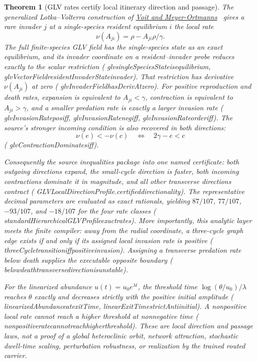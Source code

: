 \documentclass[11pt]{article}
\newtheorem{theorem}{Theorem}[section]
\newcommand{\leanname}[1]{{\scriptsize\ttfamily
  \def\_{\textunderscore\allowbreak}#1}}
\begin{document}
\begin{theorem}[GLV rates certify local itinerary direction and passage]
The generalized Lotka--Volterra construction of
\href{https://arxiv.org/abs/1806.11039}{Voit and
Meyer-Ortmanns}~\cite{voitmeyerortmanns2018} gives a rare invader $j$ at a
single-species resident equilibrium $i$ the local rate
\[
  \nu(A_{ji})=\rho-A_{ji}\rho/\gamma.
\]
The full finite-species GLV field has the single-species state as an exact
equilibrium, and its invader coordinate on a resident--invader probe reduces
exactly to the scalar restriction
(\leanname{glv\_singleSpeciesState\_is\_equilibrium},
\leanname{glvVectorField\_residentInvaderState\_invader}).  That restriction
has derivative $\nu(A_{ji})$ at zero
(\leanname{glvInvaderField\_hasDerivAt\_zero}).  For positive reproduction
and death rates, expansion is equivalent to $A_{ji}<\gamma$, contraction is
equivalent to $A_{ji}>\gamma$, and a smaller predation rate is exactly a
larger invasion rate
(\leanname{glvInvasionRate\_pos\_iff},
\leanname{glvInvasionRate\_neg\_iff},
\leanname{glvInvasionRate\_order\_iff}).  The source's stronger incoming
condition is also recovered in both directions:
\[
  \nu(e)<-\nu(c)\quad\Longleftrightarrow\quad 2\gamma-e<c
\]
(\leanname{glvContractionDominates\_iff}).

Consequently the source inequalities package into one named certificate:
both outgoing directions expand, the small-cycle direction is faster, both
incoming contractions dominate it in magnitude, and all other transverse
directions contract
(\leanname{GLVLocalDirectionProfile.certified\_directionality}).  The
representative decimal parameters are evaluated as exact rationals, yielding
$87/107$, $77/107$, $-93/107$, and $-18/107$ for the four rate classes
(\leanname{standardHierarchicalGLVProfile\_exact\_rates}).  More importantly,
this analytic layer meets the finite compiler: away from the radial
coordinate, a three-cycle graph edge exists if and only if its assigned local
invasion rate is positive
(\leanname{threeCycle\_transition\_iff\_positive\_invasion}).  Assigning a
transverse predation rate below death supplies the executable opposite
boundary
(\leanname{below\_death\_transverse\_direction\_is\_unstable}).

For the linearized abundance $u(t)=u_0e^{\lambda t}$, the threshold time
$\log(\theta/u_0)/\lambda$ reaches $\theta$ exactly and decreases strictly
with the positive initial amplitude
(\leanname{linearizedAbundance\_at\_exitTime},
\leanname{linearExitTime\_strictAnti\_initial}).  A nonpositive local rate
cannot reach a higher threshold at nonnegative time
(\leanname{nonpositive\_rate\_cannot\_reach\_higher\_threshold}).  These are
local direction and passage laws, not a proof of a global heteroclinic orbit,
network attraction, stochastic dwell-time scaling, perturbation robustness,
or realization by the trained routed carrier.
\end{theorem}
\end{document}
